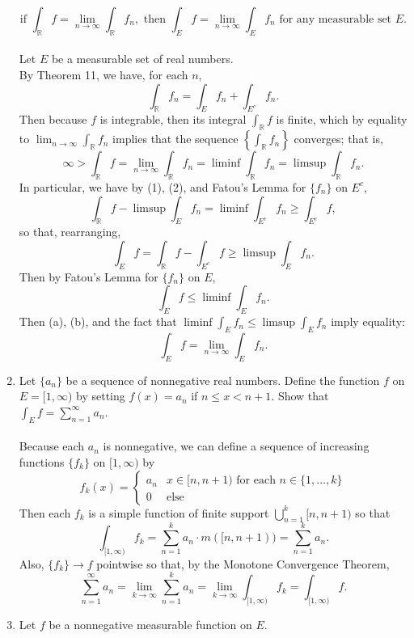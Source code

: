 \begin{enumerate}
    \[
        \text{if }\int_{\mathbb{R}}f=\lim_{n\to\infty}\int_{\mathbb{R}}f_n,\text{ then }\int_Ef=\lim_{n\to\infty}\int_Ef_n\text{ for any measurable set }E.    
    \]
    \\Let $E$ be a measurable set of real numbers.
    \\By Theorem 11, we have, for each $n$,
    \[
        \int_\mathbb{R}f_n=\int_Ef_n+\int_{E^c}f_n.\tag{1}
    \]
    Then because $f$ is integrable, then its integral $\int_{\mathbb{R}}f$ is finite, which by equality to $\lim_{n\to\infty}\int_{\mathbb{R}}f_n$ implies that the sequence $\left\{\int_{\mathbb{R}}f_n\right\}$ converges; that is,
    \[
        \infty>\int_{\mathbb{R}}f=\lim_{n\to\infty}\int_{\mathbb{R}}f_n=\liminf\int_{\mathbb{R}}f_n=\limsup\int_{\mathbb{R}}f_n.\tag{2}
    \]
    In particular, we have by (1), (2), and Fatou's Lemma for $\{f_n\}$ on $E^c$,
    \[
        \int_\mathbb{R}f-\limsup\int_Ef_n=\liminf\int_{E^c}f_n\ge\int_{E^c}f,
    \]
    so that, rearranging,
    \[
        \int_Ef=\int_\mathbb{R}f-\int_{E^c}f\ge\limsup\int_Ef_n.\tag{a}
    \]
    Then by Fatou's Lemma for $\{f_n\}$ on $E$,
    \[
        \int_Ef\le\liminf\int_Ef_n.\tag{b}
    \]
    Then (a), (b), and the fact that $\liminf\int_Ef_n\le\limsup\int_Ef_n$ imply equality:
    \[
        \int_Ef=\lim_{n\to\infty}\int_Ef_n.
    \]
    \item Let $\{a_n\}$ be a sequence of nonnegative real numbers. Define the function $f$ on $E=[1,\infty)$ by setting $f(x)=a_n$ if $n\le x<n+1$. Show that $\int_Ef=\sum_{n=1}^\infty a_n$.\\
    \\Because each $a_n$ is nonnegative, we can define a sequence of increasing functions $\{f_k\}$ on $[1,\infty)$ by
    \[
        f_k(x)=
        \begin{cases}
            a_n&x\in[n,n+1)\text{ for each }n\in\{1,\dots,k\}\\
            0&\text{else}
        \end{cases}
    \]
    Then each $f_k$ is a simple function of finite support $\bigcup_{n=1}^k[n,n+1)$ so that
    \[
        \int_{[1,\infty)}f_k=\sum_{n=1}^ka_n\cdot m([n,n+1))=\sum_{n=1}^ka_n.
    \]
    Also, $\{f_k\}\to f$ pointwise so that, by the Monotone Convergence Theorem,
    \[
        \sum_{n=1}^\infty a_n=\lim_{k\to\infty}\sum_{n=1}^k a_n=\lim_{k\to\infty}\int_{[1,\infty)}f_k=\int_{[1,\infty)}f.
    \]
    \item Let $f$ be a nonnegative measurable function on $E$.

\end{enumerate}
